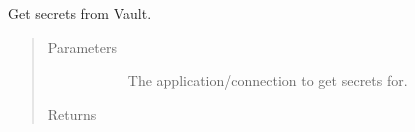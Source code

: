 \documentclass[letterpaper,10pt,english]{sphinxmanual}
\begin{document}
\begin{fulllineitems}
\label{\detokenize{autoapi/src/utils/vault/index:src.utils.vault.get_secrets}}
Get secrets from Vault.
\begin{quote}\begin{description}
\item[{Parameters}] \leavevmode\begin{description}
\item[{}] \leavevmode
The application/connection to get secrets for.

\end{description}

\item[{Returns}] \leavevmode\begin{description}
\item[{ }] \leavevmode
\end{description}

\end{description}\end{quote}

\end{fulllineitems}

\end{document}
